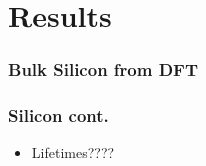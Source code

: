 \documentclass[]{beamer}
\begin{document}
\section{Results}
\begin{frame}
  \frametitle{Bulk Silicon from DFT}   %

\begin{figure}[ht]
\centering
{}
\end{figure}
 
\end{frame}

\begin{frame}
  \frametitle{Silicon cont.}   %
\begin{itemize}
  \item Lifetimes????
 \end{itemize}
\end{frame}
\end{document}
